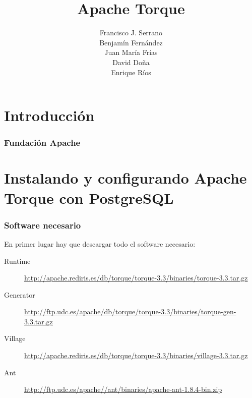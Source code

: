 \documentclass[24pt, a4paper, oneside, spanish]{beamer}
\begin{document}
\title{Apache Torque}
\author{
	Francisco J. Serrano\\
	Benjamín Fernández\\
	Juan María Frías\\
	David Doña\\
	Enrique Ríos
}

\begin{frame}
\titlepage
\end{frame}

\section{Introducción}

\begin{frame}
	\frametitle{Fundación Apache}
	
	
\end{frame}

\section{Instalando y configurando Apache Torque con PostgreSQL}

\begin{frame}
	\frametitle{Software necesario}
	
	En primer lugar hay que descargar todo el software necesario:
	\begin{description}
	\item[Runtime] \url{http://apache.rediris.es/db/torque/torque-3.3/binaries/torque-3.3.tar.gz}
	\item[Generator] \url{http://ftp.udc.es/apache/db/torque/torque-3.3/binaries/torque-gen-3.3.tar.gz}
	\item[Village] \url{http://apache.rediris.es/db/torque/torque-3.3/binaries/village-3.3.tar.gz}
	\item[Ant] \url{http://ftp.udc.es/apache//ant/binaries/apache-ant-1.8.4-bin.zip}
	\end{description}
\end{frame}
\end{document}
